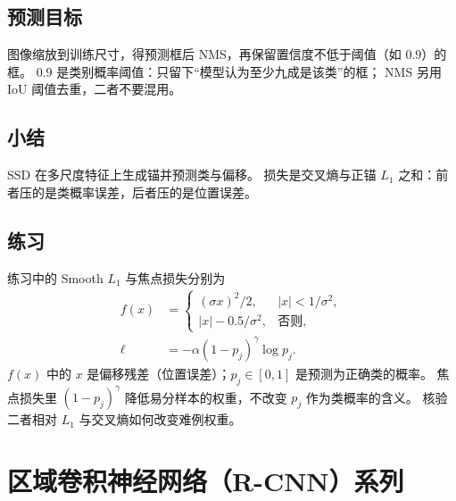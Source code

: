 \subsection{预测目标}

图像缩放到训练尺寸，得预测框后 NMS，再保留置信度不低于阈值（如 $0.9$）的框。
$0.9$ 是类别概率阈值：只留下“模型认为至少九成是该类”的框；
NMS 另用 IoU 阈值去重，二者不要混用。

\subsection{小结}

SSD 在多尺度特征上生成锚并预测类与偏移。
损失是交叉熵与正锚 $L_1$ 之和：前者压的是类概率误差，后者压的是位置误差。

\subsection{练习}

练习中的 Smooth $L_1$ 与焦点损失分别为
\begin{align*}
f(x)
&=
\begin{cases}
(\sigma x)^2/2,& |x|<1/\sigma^2,\\
|x|-0.5/\sigma^2,& \text{否则},
\end{cases}
\\
\ell
&=
-\alpha(1-p_j)^{\gamma}\log p_j.
\end{align*}
$f(x)$ 中的 $x$ 是偏移残差（位置误差）；$p_j\in[0,1]$ 是预测为正确类的概率。
焦点损失里 $(1-p_j)^{\gamma}$ 降低易分样本的权重，不改变 $p_j$ 作为类概率的含义。
核验二者相对 $L_1$ 与交叉熵如何改变难例权重。

\section{区域卷积神经网络（R-CNN）系列}





